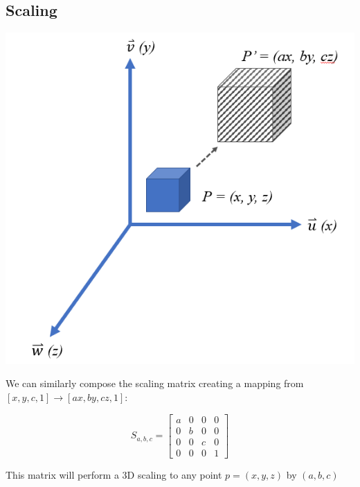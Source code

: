 \documentclass[12pt,letterpaper]{article}
\begin{document}
\subsection{Scaling}
\begin{center}
\includegraphics[scale=0.75]{scale}
\end{center}

We can similarly compose the scaling matrix creating a mapping from \\ $[x, y, c, 1] \rightarrow [ax, by, cz, 1]$:

\begin{equation}
    S_{a, b, c} = \begin{bmatrix}
        a & 0 & 0 & 0 \\
        0 & b & 0 & 0 \\
        0 & 0 & c & 0 \\
        0 & 0 & 0 & 1
    \end{bmatrix}
\end{equation}

\newpage

This matrix will perform a 3D scaling to any point $p = (x, y, z)$ by $(a, b, c)$
\end{document}
